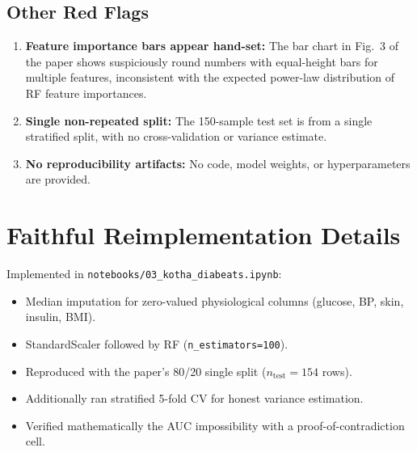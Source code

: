 \documentclass[12pt,a4paper]{article}
\begin{document}
\subsection{Other Red Flags}
\begin{enumerate}[leftmargin=*]
  \item \textbf{Feature importance bars appear hand-set:} The bar chart in Fig.~3 of the paper shows suspiciously round numbers with equal-height bars for multiple features, inconsistent with the expected power-law distribution of RF feature importances.
  \item \textbf{Single non-repeated split:} The 150-sample test set is from a single stratified split, with no cross-validation or variance estimate.
  \item \textbf{No reproducibility artifacts:} No code, model weights, or hyperparameters are provided.
\end{enumerate}

\section{Faithful Reimplementation Details}
Implemented in \texttt{notebooks/03\_kotha\_diabeats.ipynb}:
\begin{itemize}[leftmargin=*]
  \item Median imputation for zero-valued physiological columns (glucose, BP, skin, insulin, BMI).
  \item StandardScaler followed by RF (\texttt{n\_estimators=100}).
  \item Reproduced with the paper's 80/20 single split ($n_\text{test}=154$ rows).
  \item Additionally ran stratified 5-fold CV for honest variance estimation.
  \item Verified mathematically the AUC impossibility with a proof-of-contradiction cell.
\end{itemize}

\end{document}
